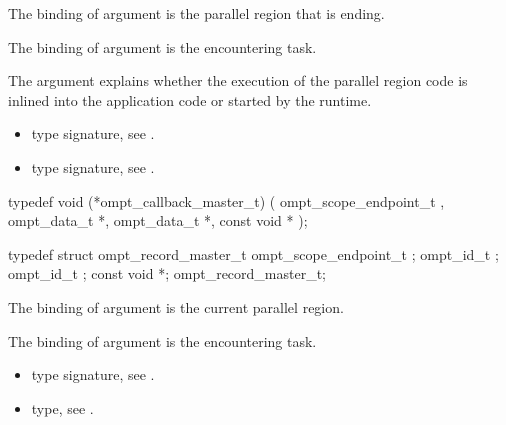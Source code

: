 The binding of argument  is the parallel
region that is ending.

The binding of argument  is the encountering
task.

The argument  explains whether the execution of the
parallel region code is inlined into the application code or started
by the runtime.

\codeptrdesc

\crossreferences
\begin{itemize}
\item {} type signature, see
.
\item {} type signature, see
.
\end{itemize}

\label{sec:ompt_callback_master_t}
\format

\begin{ccppspecific}
\begin{omptCallback}
typedef void (*ompt_callback_master_t) (
  ompt_scope_endpoint_t ,
  ompt_data_t *,
  ompt_data_t *,
  const void *
);
\end{omptCallback}
\end{ccppspecific}


\record

\begin{ccppspecific}
\begin{omptRecord}
typedef struct ompt_record_master_t {
  ompt_scope_endpoint_t ;
  ompt_id_t ;
  ompt_id_t ;
  const void *;
} ompt_record_master_t;
\end{omptRecord}
\end{ccppspecific}


\argdesc

\epdesc

The binding of argument  is the current parallel region.

The binding of argument  is the encountering task.

\codeptrdesc


\crossreferences
\begin{itemize}
\item {} type signature, see .
\item {} type, see .
\end{itemize}





